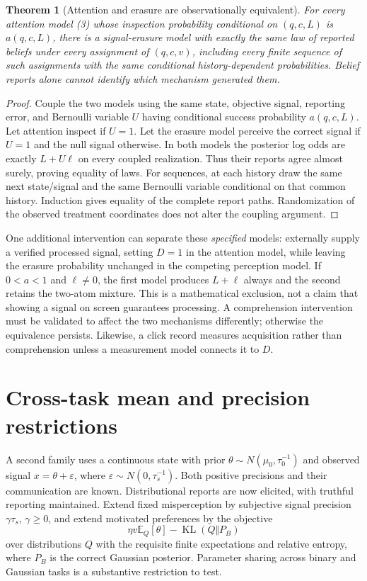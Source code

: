 \documentclass[11pt]{article}
\newtheorem{theorem}{Theorem}
\theoremstyle{remark}
\newcommand{\E}{\mathbb E}
\newcommand{\KL}{\operatorname{KL}}
\begin{document}
\begin{theorem}[Attention and erasure are observationally equivalent]
For every attention model (3) whose inspection probability conditional on $(q,c,L)$ is $a(q,c,L)$, there is a signal-erasure model with exactly the same law of reported beliefs under every assignment of $(q,c,v)$, including every finite sequence of such assignments with the same conditional history-dependent probabilities. Belief reports alone cannot identify which mechanism generated them.
\end{theorem}
\begin{proof}
Couple the two models using the same state, objective signal, reporting error, and Bernoulli variable $U$ having conditional success probability $a(q,c,L)$. Let attention inspect if $U=1$. Let the erasure model perceive the correct signal if $U=1$ and the null signal otherwise. In both models the posterior log odds are exactly $L+U\ell$ on every coupled realization. Thus their reports agree almost surely, proving equality of laws. For sequences, at each history draw the same next state/signal and the same Bernoulli variable conditional on that common history. Induction gives equality of the complete report paths. Randomization of the observed treatment coordinates does not alter the coupling argument.
\end{proof}

One additional intervention can separate these \emph{specified} models: externally supply a verified processed signal, setting $D=1$ in the attention model, while leaving the erasure probability unchanged in the competing perception model. If $0<a<1$ and $\ell\ne0$, the first model produces $L+\ell$ always and the second retains the two-atom mixture. This is a mathematical exclusion, not a claim that showing a signal on screen guarantees processing. A comprehension intervention must be validated to affect the two mechanisms differently; otherwise the equivalence persists. Likewise, a click record measures acquisition rather than comprehension unless a measurement model connects it to $D$.

\section{Cross-task mean and precision restrictions}
A second family uses a continuous state with prior $\theta\sim N(\mu_0,\tau_0^{-1})$ and observed signal $x=\theta+\varepsilon$, where $\varepsilon\sim N(0,\tau_s^{-1})$. Both positive precisions and their communication are known. Distributional reports are now elicited, with truthful reporting maintained. Extend fixed misperception by subjective signal precision $\gamma\tau_s$, $\gamma\geq0$, and extend motivated preferences by the objective
\[
 \eta v\E_Q[\theta]-\KL(Q\Vert P_B)                     \tag{7}
\]
over distributions $Q$ with the requisite finite expectations and relative entropy, where $P_B$ is the correct Gaussian posterior. Parameter sharing across binary and Gaussian tasks is a substantive restriction to test.
\end{document}
